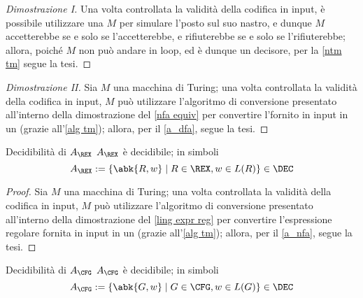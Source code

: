 \documentclass[a4paper, 12pt]{report}
\begin{document}
    \begin{proof}[Dimostrazione I]
        Una volta controllata la validità della codifica in input, è possibile utilizzare una \NTM $M$ per simulare l'\NFA posto sul suo nastro, e dunque $M$ accetterebbe se e solo se l'\NFA accetterebbe, e rifiuterebbe se e solo se l'\NFA rifiuterebbe; allora, poiché $M$ non può andare in loop, ed è dunque un decisore, per la \cref{ntm tm} segue la tesi.
    \end{proof}

    \begin{proof}[Dimostrazione II]
        Sia $M$ una macchina di Turing; una volta controllata la validità della codifica in input, $M$ può utilizzare l'algoritmo di conversione presentato all'interno della dimostrazione del \cref{nfa equiv} per convertire l'\NFA fornito in input in un \DFA(grazie all'\cref{alg tm}); allora, per il \cref{a_dfa}, segue la tesi.
    \end{proof}

    \begin{framedthm}{Decidibilità di $A_\REX$}
        $A_\REX$ è decidibile; in simboli $$A_\REX := \{\abk{R, w} \mid R \in \REX, w \in L(R)\} \in \DEC$$
    \end{framedthm}

    \begin{proof}
        Sia $M$ una macchina di Turing; una volta controllata la validità della codifica in input, $M$ può utilizzare l'algoritmo di conversione presentato all'interno della dimostrazione del \cref{ling expr reg} per convertire l'espressione regolare fornita in input in un \NFA (grazie all'\cref{alg tm}); allora, per il \cref{a_nfa}, segue la tesi.
    \end{proof}

    \begin{framedthm}[label={a_cfg in dec}]{Decidibilità di $A_\CFG$}
        $A_\CFG$ è decidibile; in simboli $$A_\CFG := \{\abk{G, w} \mid G \in \CFG, w \in L(G)\} \in \DEC$$
    \end{framedthm}
\end{document}
